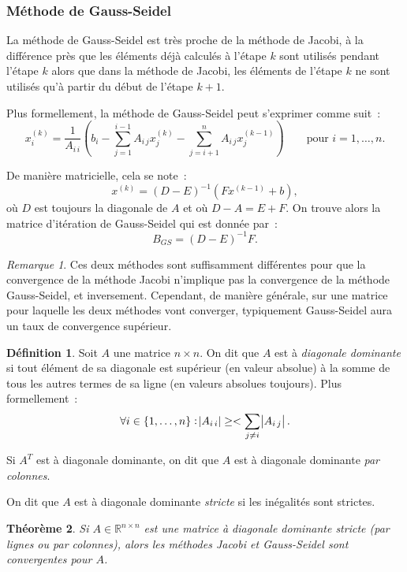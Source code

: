\documentclass{article}
\newtheorem{thm}{Théorème}[section]
\theoremstyle{definition}
\newtheorem{déf}[thm]{Définition}
\theoremstyle{remark}
\newtheorem*{rmq}{Remarque}
\newcommand{\R}{\mathbb R}
\begin{document}
		\subsubsection{Méthode de Gauss-Seidel}
		La méthode de Gauss-Seidel est très proche de la méthode de Jacobi, à la différence près que les éléments déjà calculés à l'étape $k$ sont utilisés
		pendant l'étape $k$ alors que dans la méthode de Jacobi, les éléments de l'étape $k$ ne sont utilisés qu'à partir du début de l'étape $k+1$.

		Plus formellement, la méthode de Gauss-Seidel peut s'exprimer comme suit~:
		\[x^{(k)}_i = \frac 1{A_{i\,i}}\left(b_i - \sum_{j=1}^{i-1}A_{i\,j}x^{(k)}_j - \sum_{j=i+1}^nA_{i\,j}x^{(k-1)}_j\right)\qquad\text{pour }i=1, \dotsc, n.\]

		De manière matricielle, cela se note~:
		\[x^{(k)} = (D-E)^{-1}\left(Fx^{(k-1)} + b\right),\]
		où $D$ est toujours la diagonale de $A$ et où $D-A = E+F$. On trouve alors la matrice d'itération de Gauss-Seidel qui est donnée par~:
		\[B_{GS} = (D-E)^{-1}F.\]

		\begin{rmq} Ces deux méthodes sont suffisamment différentes pour que la convergence de la méthode Jacobi n'implique pas la convergence de la méthode
		Gauss-Seidel, et inversement. Cependant, de manière générale, sur une matrice pour laquelle les deux méthodes vont converger, typiquement Gauss-Seidel
		aura un taux de convergence supérieur.
		\end{rmq}

		\begin{déf} Soit $A$ une matrice $n \times n$. On dit que $A$ est à \emph{diagonale dominante} si tout élément de sa diagonale est supérieur (en valeur
		absolue) à la somme de tous les autres termes de sa ligne (en valeurs absolues toujours). Plus formellement~:
		\[\forall i \in \{1, \dotsc, n\} : \abs {A_{i\,i}} \geq < \sum_{j \neq i}\abs{A_{i\,j}}.\]

		Si $A^T$ est à diagonale dominante, on dit que $A$ est à diagonale dominante \emph{par colonnes}.

		On dit que $A$ est à diagonale dominante \emph{stricte} si les inégalités sont strictes.
		\end{déf}

		\begin{thm} Si $A \in \R^{n \times n}$ est une matrice à diagonale dominante stricte (par lignes ou par colonnes), alors les méthodes Jacobi \emph{et}
		Gauss-Seidel sont convergentes pour $A$.
		\end{thm}
\end{document}
